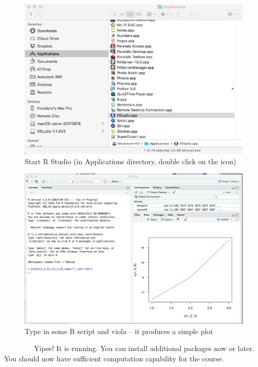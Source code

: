 \begin{figure}[h!] %
   \centering
   \includegraphics[width=5in]{./1-Introduction/LaunchRStudioMac.jpeg} 
   \caption{Start R Studio (in Applications directory, double click on the icon)}
\end{figure}

\begin{figure}[h!] %
   \centering
   \includegraphics[width=5in]{./1-Introduction/TestMacInstall.jpeg} 
   \caption{Type in some R script and viola -- it produces a simple plot}
\end{figure}

\newpage~
\newpage~
\newpage~
\newpage~
\newpage~
Yipee!  It is running.  You can install additional packages now or later.  You should now have sufficient computation capability for the course.  



